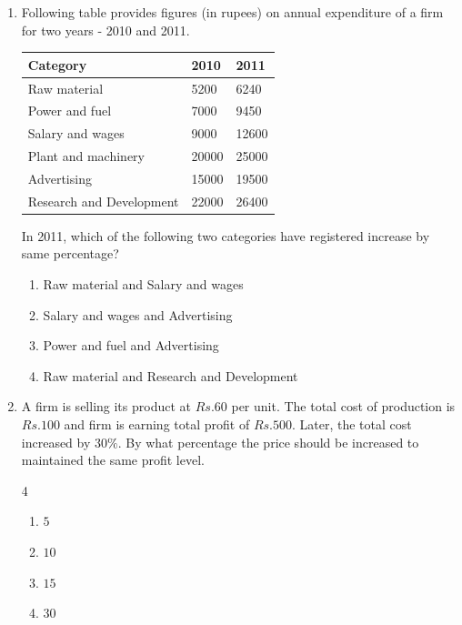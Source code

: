 \documentclass[journal]{IEEEtran}
\theoremstyle{remark}
\begin{document}
\begin{enumerate}
\begin {multicols}{4}
\begin{enumerate}
\item  $(2, \frac{1}{3})$ 
\item  $(\frac{1}{2}, 3)$ 
\item  $(\frac{3}{2}, 9)$ 
\item  $(\frac{2}{3}, 9)$ 
\end{enumerate}
\end{multicols}
\item   Following table provides figures (in rupees) on annual expenditure of a firm for two years - 2010 and 2011. 
\begin{center}
\begin{tabular}{|l|l|l|}
\hline
\textbf{Category} & \textbf{2010} &\textbf{2011}\\
\hline
Raw material& 5200& 6240 \\
Power and fuel  & 7000 & 9450  \\
Salary and wages & 9000 & 12600 \\
Plant and machinery & 20000 & 25000\\
Advertising & 15000& 19500  \\
Research and Development & 22000 & 26400 \\
\hline
\end{tabular}
\end{center}
In 2011, which of the following two categories have registered increase by same percentage?
\hfill{}
\begin{enumerate}
\item  Raw material and Salary and wages
\item   Salary and wages and Advertising
\item   Power and fuel and Advertising
\item  Raw material and Research and Development
\end{enumerate}
\item   A firm is selling its product at $Rs. 60$ per unit. The total cost of production is $Rs. 100$ and firm is earning total profit of $Rs. 500$. Later, the total cost increased by $30\%$. By what percentage the price should be increased to maintained the same profit level.
\hfill{}

\begin {multicols}{4}
\begin{enumerate}
\item  $5$ 
\item  $10$
\item $15 $
\item $30$ 
\end{enumerate}
\end{multicols}


\end{enumerate}
\end{document}
